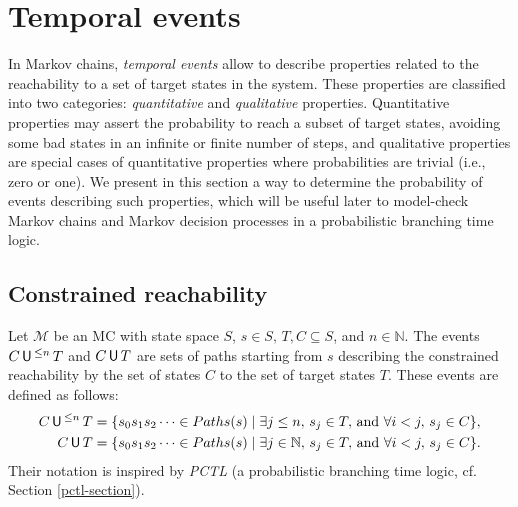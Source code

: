 \section{Temporal events}\label{tempevent}
In Markov chains, \textit{temporal events} allow to describe %
properties related to the reachability to a set of target states in the system. These properties are classified into two categories: \textit{quantitative} and \textit{qualitative} properties.
Quantitative properties may assert the probability to reach a subset of target states, avoiding some bad states in an infinite or finite number of steps, and
qualitative properties are special cases of quantitative properties where probabilities are trivial (i.e., zero or one).
We present in this section a way to determine the probability of events describing such properties, which will be useful later to model-check Markov chains and Markov decision processes in a probabilistic branching time logic.
\subsection{Constrained reachability}
\begin{definition}
Let $\mathcal{M}$ be an MC with state space $S$, $s \in S, \, T, C \subseteq S$, and $n \in \mathbb{N}$. The events $C \,\text{\sffamily U}\,^{\leq n} \, T$ and $C \,\text{\sffamily U}\, T$ are sets of paths starting from $s$ describing the constrained reachability by the set of states $C$ to the set of target states $T$.
These events are defined as follows:
\begin{align*}
  C \,\text{\sffamily U}\,^{\leq n} \, T &= \{ s_0 s_1 s_2 \dots \in Paths(s) \; | \; \exists j \leq n, \, s_j \in T, \, \text{and } \forall i < j,\, s_j \in C \}, \\
  C \,\text{\sffamily U}\, T &= \{ s_0s_1s_2 \dots \in Paths(s) \; | \; \exists j \in \mathbb{N}, \, s_j \in T, \, \text{and } \forall i < j, \, s_j \in C \}.
\end{align*}
Their notation is inspired by \textit{PCTL} (a probabilistic branching time logic, cf. Section \ref{pctl-section}).
\end{definition}

